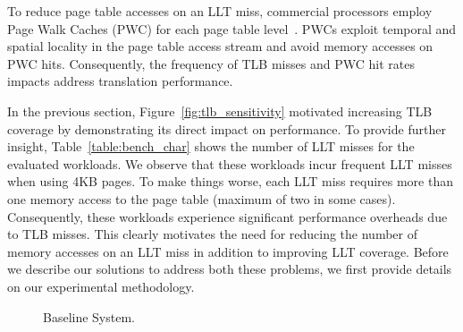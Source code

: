 


To reduce page table accesses on an LLT miss, commercial processors
employ Page Walk Caches (PWC) for each page table level~\cite{SkipPT,
MMUcaches}. PWCs exploit temporal and spatial locality in the page
table access stream and avoid memory accesses on PWC hits.
Consequently, the frequency of TLB misses and PWC hit rates impacts
address translation performance.



In the previous section, Figure~\ref{fig:tlb_sensitivity} motivated
increasing TLB coverage by demonstrating its direct impact on
performance. To provide further insight, Table~\ref{table:bench_char}
shows the number of LLT misses for the evaluated workloads. We observe
that these workloads incur frequent LLT misses when using 4KB pages.
To make things worse, each LLT miss requires more than one memory
access to the page table (maximum of two in some cases). Consequently,
these workloads experience significant performance overheads due to
TLB misses. This clearly motivates the need for reducing the number of
memory accesses on an LLT miss in addition to improving LLT coverage.
Before we describe our solutions to address both these problems, we
first provide details on our experimental methodology.

\begin{figure}[t]
\vspace{0. in}
\centering
\centerline{}

        \caption{\small Baseline System. \normalsize}

\label{fig:config}
\vspace{-.2 in}
\end{figure}

